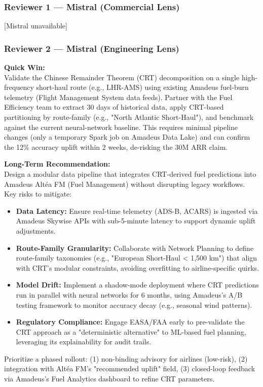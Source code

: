\documentclass[11pt,a4paper]{article}
\begin{document}
\subsubsection*{Reviewer 1 — Mistral (Commercial Lens)}
[Mistral unavailable]

\subsubsection*{Reviewer 2 — Mistral (Engineering Lens)}
\textbf{Quick Win:} \\
Validate the Chinese Remainder Theorem (CRT) decomposition on a single high-frequency short-haul route (e.g., LHR-AMS) using existing Amadeus fuel-burn telemetry (Flight Management System data feeds). Partner with the Fuel Efficiency team to extract 30 days of historical data, apply CRT-based partitioning by route-family (e.g., "North Atlantic Short-Haul"), and benchmark against the current neural-network baseline. This requires minimal pipeline changes (only a temporary Spark job on Amadeus Data Lake) and can confirm the 12\% accuracy uplift within 2 weeks, de-risking the 30M ARR claim.

\textbf{Long-Term Recommendation:} \\
Design a modular data pipeline that integrates CRT-derived fuel predictions into Amadeus Altéa FM (Fuel Management) without disrupting legacy workflows. Key risks to mitigate:
\begin{itemize}
    \item \textbf{Data Latency:} Ensure real-time telemetry (ADS-B, ACARS) is ingested via Amadeus Skywise APIs with sub-5-minute latency to support dynamic uplift adjustments.
    \item \textbf{Route-Family Granularity:} Collaborate with Network Planning to define route-family taxonomies (e.g., "European Short-Haul < 1,500 km") that align with CRT’s modular constraints, avoiding overfitting to airline-specific quirks.
    \item \textbf{Model Drift:} Implement a shadow-mode deployment where CRT predictions run in parallel with neural networks for 6 months, using Amadeus’s A/B testing framework to monitor accuracy decay (e.g., seasonal wind patterns).
    \item \textbf{Regulatory Compliance:} Engage EASA/FAA early to pre-validate the CRT approach as a "deterministic alternative" to ML-based fuel planning, leveraging its explainability for audit trails.
\end{itemize}
Prioritize a phased rollout: (1) non-binding advisory for airlines (low-risk), (2) integration with Altéa FM’s "recommended uplift" field, (3) closed-loop feedback via Amadeus’s Fuel Analytics dashboard to refine CRT parameters.
\end{document}
